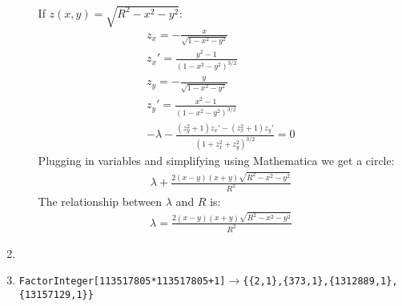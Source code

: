 \documentclass[12pt]{article}
\begin{document}
\begin{enumerate}
\begin{enumerate}
\begin{gather*}
            \end{gather*}
            If $z(x,y)=\sqrt{R^2-x^2-y^2}$:
            \begin{gather*}
                z_x=-\frac{x}{\sqrt{1-x^2-y^2}}\\
                z_x'=\frac{y^2-1}{\left(1-x^2-y^2\right)^{3/2}}\\
                z_y=-\frac{y}{\sqrt{1-x^2-y^2}}\\
                z_y'=\frac{x^2-1}{\left(1-x^2-y^2\right)^{3/2}}\\
                -\lambda-\frac{(z_y^2+1)z_x'-(z_x^2+1)z_y'}{\left( 1+z_x^2+z_y^2 \right)^{3/2}}=0
            \end{gather*}
            Plugging in variables and simplifying using Mathematica we get a circle:
            \begin{gather*}
                \lambda+\frac{2 (x-y) (x+y) \sqrt{R^2-x^2-y^2}}{R^2}
            \end{gather*}
            The relationship between $\lambda$ and $R$ is:
            \begin{gather*}
                \lambda= \frac{2 (x-y) (x+y) \sqrt{R^2-x^2-y^2}}{R^2}
            \end{gather*}
        \end{enumerate}
        \item
        \item \texttt{FactorInteger[113517805*113517805+1]}$\rightarrow$\texttt{\{\{2,1\},\{373,1\},\{1312889,1\},\{13157129,1\}\}}
    \end{enumerate}
\end{document}
